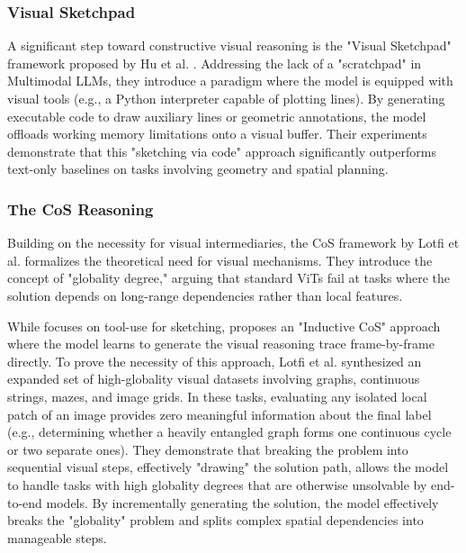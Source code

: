 \documentclass{l4proj}
\begin{document}
\subsubsection{Visual Sketchpad}
A significant step toward constructive visual reasoning is the "Visual Sketchpad" framework proposed by Hu et al. \cite{hu2024visual}. Addressing the lack of a "scratchpad" in Multimodal LLMs, they introduce a paradigm where the model is equipped with visual tools (e.g., a Python interpreter capable of plotting lines). By generating executable code to draw auxiliary lines or geometric annotations, the model offloads working memory limitations onto a visual buffer. Their experiments demonstrate that this "sketching via code" approach significantly outperforms text-only baselines on tasks involving geometry and spatial planning.


\subsubsection{The CoS Reasoning}
Building on the necessity for visual intermediaries, the CoS framework by Lotfi et al. \cite{lotfi2024cos} formalizes the theoretical need for visual mechanisms. They introduce the concept of "globality degree," arguing that standard ViTs fail at tasks where the solution depends on long-range dependencies rather than local features.

While \cite{hu2024visual} focuses on tool-use for sketching, \cite{lotfi2024cos} proposes an "Inductive CoS" approach where the model learns to generate the visual reasoning trace frame-by-frame directly. To prove the necessity of this approach, Lotfi et al. synthesized an expanded set of high-globality visual datasets involving graphs, continuous strings, mazes, and image grids. In these tasks, evaluating any isolated local patch of an image provides zero meaningful information about the final label (e.g., determining whether a heavily entangled graph forms one continuous cycle or two separate ones). They demonstrate that breaking the problem into sequential visual steps, effectively "drawing" the solution path, allows the model to handle tasks with high globality degrees that are otherwise unsolvable by end-to-end models. By incrementally generating the solution, the model effectively breaks the "globality" problem and splits complex spatial dependencies into manageable steps.
\end{document}
